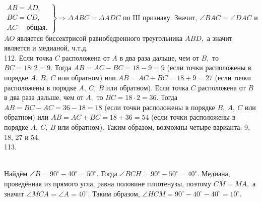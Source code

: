 \documentclass[12pt]{article}
\begin{document}
$\left.\begin{array}{l}AB=AD,\\
BC=CD,\\
AC\text{--- общая.}  \end{array}\right\}\Rightarrow \Delta ABC=\Delta ADC\text{ по III признаку.}$ Значит, $\angle BAC=\angle DAC$ и $AO$ является биссектрисой равнобедренного треугольника $ABD,$ а значит является и медианой, ч.т.д.\\
112. Если точка $C$ расположена от $A$ в два раза дальше, чем от $B,$ то $BC=18:2=9.$ Тогда $AB=AC-BC=18-9=9$ (если точки расположены в порядке $A,\ B,\ C$ или обратном) или $AB=AC+BC=18+9=27$ (если точки расположены в порядке $A,\ C,\ B$ или обратном). Если точка $C$ расположена от $B$ в два раза дальше, чем от $A,$ то $BC=18\cdot2=36.$ Тогда $AB=BC-AC=36-18=18$ (если точки расположены в порядке $B,\ A,\ C$ или обратном) или $AB=AC+BC=18+36=54$ (если точки расположены в порядке $A,\ C,\ B$ или обратном). Таким образом, возможны четыре варианта: 9, 18, 27 и 54.\\
113. \begin{figure}[ht!]
\end{figure}\\
Найдём $\angle B=90^\circ-40^\circ=50^\circ.$ Тогда $\angle BCH=90^\circ-50^\circ=40^\circ.$ Медиана, проведённая из прямого угла, равна половине гипотенузы, поэтому $CM=MA,$ а значит $\angle MCA=\angle A=40^\circ.$ Таким образом, $\angle HCM=90^\circ-40^\circ-40^\circ=10^\circ.$\\
\end{document}
